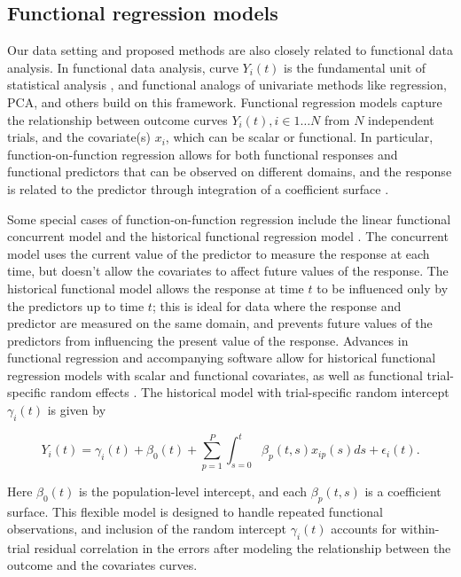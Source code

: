 \documentclass[preprint]{JASA}
\begin{document}
\hypertarget{functional-regression-models}{%
\subsection{Functional regression
models}\label{functional-regression-models}}

\label{sec:fda}

Our data setting and proposed methods are also closely related to
functional data analysis. In functional data analysis, curve \(Y_i(t)\)
is the fundamental unit of statistical analysis \citep{ramsay2005}, and
functional analogs of univariate methods like regression, PCA, and
others build on this framework. Functional regression models capture the
relationship between outcome curves \(Y_i(t), i \in 1 \ldots N\) from
\(N\) independent trials, and the covariate(s) \(x_i\), which can be
scalar or functional. In particular, function-on-function regression
allows for both functional responses and functional predictors that can
be observed on different domains, and the response is related to the
predictor through integration of a coefficient surface
\citep{ramsay2005}.

Some special cases of function-on-function regression include the linear
functional concurrent model \citep{fan2008, goldsmith2017} and the
historical functional regression model \citep{malfait2003}. The
concurrent model uses the current value of the predictor to measure the
response at each time, but doesn't allow the covariates to affect future
values of the response. The historical functional model allows the
response at time \(t\) to be influenced only by the predictors up to
time \(t\); this is ideal for data where the response and predictor are
measured on the same domain, and prevents future values of the
predictors from influencing the present value of the response. Advances
in functional regression and accompanying software allow for historical
functional regression models with scalar and functional covariates, as
well as functional trial-specific random effects
\citep{scheipl2015, scheipl2016, refund}. The historical model with
trial-specific random intercept \(\gamma_i(t)\) is given by

\begin{equation}
\label{eq:fhist_mod}    
Y_i(t) = \gamma_i(t) + \beta_0(t) +  \sum_{p = 1}^P \int_{s = 0}^t \beta_p(t,s) x_{ip}(s)ds+ \epsilon_i(t).
\end{equation}

\noindent Here \(\beta_0(t)\) is the population-level intercept, and
each \(\beta_p(t,s)\) is a coefficient surface. This flexible model is
designed to handle repeated functional observations, and inclusion of
the random intercept \(\gamma_i(t)\) accounts for within-trial residual
correlation in the errors after modeling the relationship between the
outcome and the covariates curves.
\end{document}
